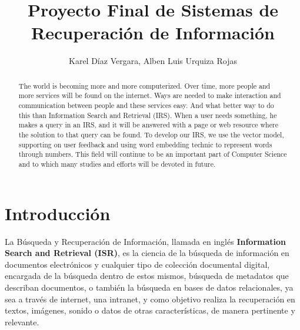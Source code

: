 \documentclass{llncs}
\begin{document}
\pagestyle{headings}  %


\title{Proyecto Final de Sistemas de Recuperación de Información}

%
\author{Karel Díaz Vergara, Alben Luis Urquiza Rojas}
%



\maketitle              %

\begin{abstract}
The world is becoming more and more computerized. Over time, more people and more services will be found on the internet. Ways are needed to make interaction and communication between people and these services easy. And what better way to do this than Information Search and Retrieval (IRS). When a user needs something, he makes a query in an IRS, and it will be answered with a page or web resource where the solution to that query can be found. To develop our IRS, we use the vector model, supporting on user feedback and using word embedding technic to represent words through numbers. This field will continue to be an important part of Computer Science and to which many studies and efforts will be devoted in future.
\end{abstract}
%
\section{Introducción}

La Búsqueda y Recuperación de Información, llamada en inglés \textbf{Information Search and Retrieval (ISR)}, es la ciencia de la búsqueda de información en documentos electrónicos y cualquier tipo de colección documental digital, encargada de la búsqueda dentro de estos mismos, búsqueda de metadatos que describan documentos, o también la búsqueda en bases de datos relacionales, ya sea a través de internet, una intranet, y como objetivo realiza la recuperación en textos, imágenes, sonido o datos de otras características, de manera pertinente y relevante.
\end{document}
